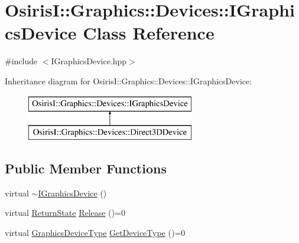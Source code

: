 \hypertarget{class_osiris_i_1_1_graphics_1_1_devices_1_1_i_graphics_device}{\section{Osiris\-I\-:\-:Graphics\-:\-:Devices\-:\-:I\-Graphics\-Device Class Reference}
\label{class_osiris_i_1_1_graphics_1_1_devices_1_1_i_graphics_device}
}


{\ttfamily \#include $<$I\-Graphics\-Device.\-hpp$>$}

Inheritance diagram for Osiris\-I\-:\-:Graphics\-:\-:Devices\-:\-:I\-Graphics\-Device\-:\begin{figure}[H]
\begin{center}
\leavevmode
\includegraphics[height=2.000000cm]{class_osiris_i_1_1_graphics_1_1_devices_1_1_i_graphics_device}
\end{center}
\end{figure}
\subsection*{Public Member Functions}
\begin{DoxyCompactItemize}
\item 
virtual \hyperlink{class_osiris_i_1_1_graphics_1_1_devices_1_1_i_graphics_device_a02511a69f75249ef61eb177aa8def3f9}{$\sim$\-I\-Graphics\-Device} ()
\item 
virtual \hyperlink{namespace_osiris_i_a8f53bf938dc75c65c6a529694514013e}{Return\-State} \hyperlink{class_osiris_i_1_1_graphics_1_1_devices_1_1_i_graphics_device_ace3090a9d2d7f5c3ad1f85f98581a453}{Release} ()=0
\item 
virtual \hyperlink{namespace_osiris_i_1_1_graphics_1_1_devices_a6d815f0b8bccde3467ccf09f1f69e334}{Graphics\-Device\-Type} \hyperlink{class_osiris_i_1_1_graphics_1_1_devices_1_1_i_graphics_device_a484fc89aa6479d1b8ea566ff0377a9af}{Get\-Device\-Type} ()=0
\end{DoxyCompactItemize}
